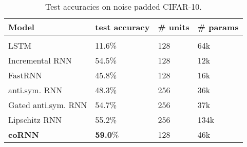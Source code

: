 \documentclass{article} \usepackage{iclr2021_conference,times}
\begin{document}
\begin{table}[h!]
\caption{Test accuracies on noise padded CIFAR-10.}
\label{tab:cifar}
\begin{center}
\begin{tabular}{llll}
{ Model} &  test accuracy & \# units & { \# params}
\\ \hline \\
LSTM \citep{inc_rnn}&  11.6\% & 128 & 64k\\
Incremental RNN \citep{inc_rnn}& 54.5\% & 128 & 12k \\
FastRNN \citep{inc_rnn}& 45.8\% & 128 & 16k\\
anti.sym. RNN \citep{anti} & 48.3\% & 256 & 36k\\
Gated anti.sym. RNN \citep{anti}& 54.7\% &256 & 37k \\
Lipschitz RNN \citep{lip_rnn}& 55.2\% & 256 & 134k\\
\textbf{coRNN} & \textbf{59.0}\% & 128 & 46k\\
\end{tabular}
\end{center}
\end{table}
\end{document}
